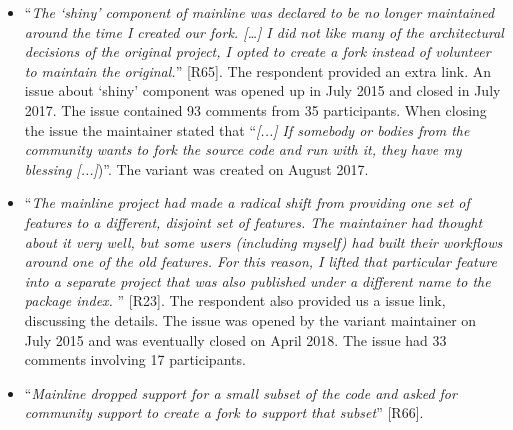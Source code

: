 \begin{itemize}[leftmargin=*]
\item ``\emph{The `shiny' component of mainline was declared to be no longer maintained around the time I created our fork. [\ldots] I did not like many of the architectural decisions of the original project, I opted to create a fork instead of volunteer to maintain the original.}'' [R65]. The respondent provided an extra link. An issue about `shiny' component was opened up in July 2015 and closed in July 2017. The issue contained 93 comments from 35 participants. When closing the issue the maintainer stated that ``\textit{[...] If somebody or bodies from the community wants to fork the source code and run with it, they have my blessing [...]})''. The variant was created on August 2017.
\item ``\emph{The mainline project had made a radical shift from providing one set of features %
to a different, disjoint set of features. %
The maintainer had thought about it very well, but some users (including myself) had built their workflows around one of the old features. For this reason, I lifted that particular feature into a separate project that was also published under a different name to the package index.%
}'' [R23]. The respondent also provided us a \gh issue link, discussing the details. The issue was opened by the variant maintainer on July 2015 and was eventually closed on April 2018. The issue had 33 comments involving 17 participants. %

\item ``\textit{Mainline dropped support for a small subset of the code and asked for community support to create a fork to support that subset}'' [R66].
\end{itemize}

